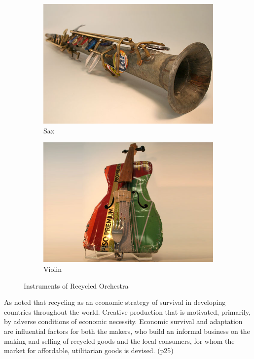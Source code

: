 \begin{figure}
    \begin{subfigure}[b]{0.48\textwidth}
        \includegraphics[width=\textwidth]{graphics/landfill_harmonic-sax.jpg}
        \caption{Sax}
        \label{fig:landfill_harmonic-sax}
    \end{subfigure}
    \hfill
    \begin{subfigure}[b]{0.48\textwidth}
        \includegraphics[width=\textwidth]{graphics/landfill_harmonic-violin.jpg}
        \caption{Violin}
        \label{fig:landfill_harmonic-violin}
    \end{subfigure}
    \caption{Instruments of Recycled Orchestra}\label{fig:animals}
\end{figure}

As noted that recycling as an economic strategy of survival in developing countries throughout the world. Creative production that is motivated, primarily, by adverse conditions of economic necessity. Economic survival and adaptation are influential factors for both the makers, who build an informal business on the making and selling of recycled goods and the local consumers, for whom the market for affordable, utilitarian goods is devised. (p25)


